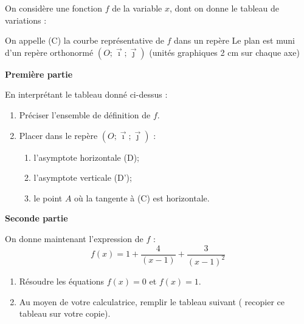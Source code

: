 {\parindent=0pt
On considère une fonction $f$ de la variable $x$, dont on donne le tableau de variations :

\begin{center}
\end{center}

On appelle (C) la courbe représentative de $f$ dans un repère Le plan est muni d'un repère orthonormé $(O;\vec{\imath};\vec{\jmath})$ (unités graphiques 2 cm sur chaque axe)

\vspace{6pt}
\textbf{Première partie}

En interprétant le tableau donné ci-dessus :%

 \begin{enumerate}
 \item  Préciser l'ensemble de définition de $f$.
 \item  Placer dans le repère $(O;\vec{\imath};\vec{\jmath})$  :
 \begin{enumerate}
 \item  l'asymptote horizontale (D);
 \item  l'asymptote verticale (D');
 \item  le point $A$ où la tangente à (C) est horizontale.
 \end{enumerate}
 \end{enumerate}

\textbf{Seconde partie}

On donne maintenant l'expression de $f$ :
\[
f(x)=1 + \dfrac{4}{(x-1)}    + \dfrac{3}{(x-1)^2}
\]
\begin{enumerate}
 \item Résoudre les équations $f(x)=0$ et $f(x)=1$.
 \item  Au moyen de votre calculatrice, remplir le tableau suivant
  ( recopier ce tableau sur votre copie).
\end{enumerate}
}


